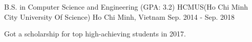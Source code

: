 

\begin{cventries}

  \cventry
    {B.S. in Computer Science and Engineering (GPA: 3.2)} %
    {HCMUS(Ho Chi Minh City University Of Science)} %
    {Ho Chi Minh, Vietnam} %
    {Sep. 2014 - Sep. 2018} %
    {
      \begin{cvitems} %
        \item {Got a scholarship for top high-achieving students in 2017.}
      \end{cvitems}
    }

\end{cventries}
